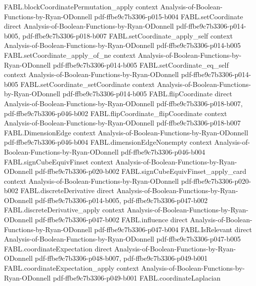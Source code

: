 \begin{theorem}
\proofstep
  {FABL.blockCoordinatePermutation_apply}
  {context}
  {Analysis-of-Boolean-Functions-by-Ryan-ODonnell}
  {pdf-ffbe9c7b3306-p015-b004}
\proofstep
  {FABL.setCoordinate}
  {direct}
  {Analysis-of-Boolean-Functions-by-Ryan-ODonnell}
  {pdf-ffbe9c7b3306-p014-b005,
    pdf-ffbe9c7b3306-p018-b007}
\proofstep
  {FABL.setCoordinate_apply_self}
  {context}
  {Analysis-of-Boolean-Functions-by-Ryan-ODonnell}
  {pdf-ffbe9c7b3306-p014-b005}
\proofstep
  {FABL.setCoordinate_apply_of_ne}
  {context}
  {Analysis-of-Boolean-Functions-by-Ryan-ODonnell}
  {pdf-ffbe9c7b3306-p014-b005}
\proofstep
  {FABL.setCoordinate_eq_self}
  {context}
  {Analysis-of-Boolean-Functions-by-Ryan-ODonnell}
  {pdf-ffbe9c7b3306-p014-b005}
\proofstep
  {FABL.setCoordinate_setCoordinate}
  {context}
  {Analysis-of-Boolean-Functions-by-Ryan-ODonnell}
  {pdf-ffbe9c7b3306-p014-b005}
\proofstep
  {FABL.flipCoordinate}
  {direct}
  {Analysis-of-Boolean-Functions-by-Ryan-ODonnell}
  {pdf-ffbe9c7b3306-p018-b007,
    pdf-ffbe9c7b3306-p046-b002}
\proofstep
  {FABL.flipCoordinate_flipCoordinate}
  {context}
  {Analysis-of-Boolean-Functions-by-Ryan-ODonnell}
  {pdf-ffbe9c7b3306-p018-b007}
\proofstep
  {FABL.DimensionEdge}
  {context}
  {Analysis-of-Boolean-Functions-by-Ryan-ODonnell}
  {pdf-ffbe9c7b3306-p046-b004}
\proofstep
  {FABL.dimensionEdgeNonempty}
  {context}
  {Analysis-of-Boolean-Functions-by-Ryan-ODonnell}
  {pdf-ffbe9c7b3306-p046-b004}
\proofstep
  {FABL.signCubeEquivFinset}
  {context}
  {Analysis-of-Boolean-Functions-by-Ryan-ODonnell}
  {pdf-ffbe9c7b3306-p020-b002}
\proofstep
  {FABL.signCubeEquivFinset_apply_card}
  {context}
  {Analysis-of-Boolean-Functions-by-Ryan-ODonnell}
  {pdf-ffbe9c7b3306-p020-b002}
\proofstep
  {FABL.discreteDerivative}
  {direct}
  {Analysis-of-Boolean-Functions-by-Ryan-ODonnell}
  {pdf-ffbe9c7b3306-p014-b005,
    pdf-ffbe9c7b3306-p047-b002}
\proofstep
  {FABL.discreteDerivative_apply}
  {context}
  {Analysis-of-Boolean-Functions-by-Ryan-ODonnell}
  {pdf-ffbe9c7b3306-p047-b002}
\proofstep
  {FABL.influence}
  {direct}
  {Analysis-of-Boolean-Functions-by-Ryan-ODonnell}
  {pdf-ffbe9c7b3306-p047-b004}
\proofstep
  {FABL.IsRelevant}
  {direct}
  {Analysis-of-Boolean-Functions-by-Ryan-ODonnell}
  {pdf-ffbe9c7b3306-p047-b005}
\proofstep
  {FABL.coordinateExpectation}
  {direct}
  {Analysis-of-Boolean-Functions-by-Ryan-ODonnell}
  {pdf-ffbe9c7b3306-p048-b007,
    pdf-ffbe9c7b3306-p049-b001}
\proofstep
  {FABL.coordinateExpectation_apply}
  {context}
  {Analysis-of-Boolean-Functions-by-Ryan-ODonnell}
  {pdf-ffbe9c7b3306-p049-b001}
\proofstep
  {FABL.coordinateLaplacian}

\end{theorem}
